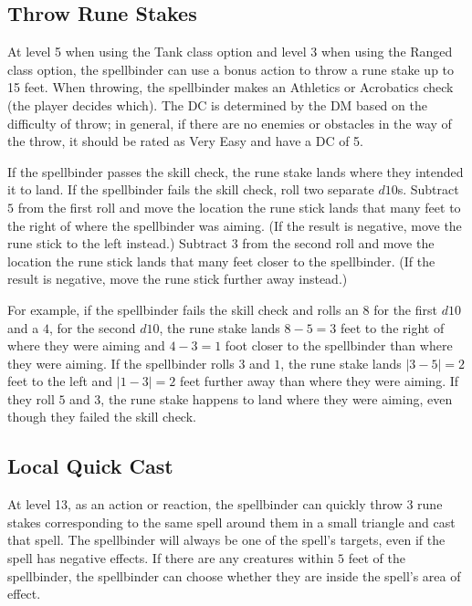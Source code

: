 \subsection{Throw Rune Stakes}
\label{ability:throw-rune-stakes}
At level 5 when using the Tank class option and level 3 when using the Ranged class option, the spellbinder can use a bonus action to throw a rune stake up to 15 feet. When throwing, the spellbinder makes an Athletics or Acrobatics check (the player decides which). The DC is determined by the DM based on the difficulty of throw; in general, if there are no enemies or obstacles in the way of the throw, it should be rated as Very Easy and have a DC of 5.

If the spellbinder passes the skill check, the rune stake lands where they intended it to land. If the spellbinder fails the skill check, roll two separate $d10$s. Subtract $5$ from the first roll and move the location the rune stick lands that many feet to the right of where the spellbinder was aiming. (If the result is negative, move the rune stick to the left instead.) Subtract $3$ from the second roll and move the location the rune stick lands that many feet closer to the spellbinder. (If the result is negative, move the rune stick further away instead.)

For example, if the spellbinder fails the skill check and rolls an $8$ for the first $d10$ and a $4$, for the second $d10$, the rune stake lands $8-5=3$ feet to the right of where they were aiming and $4-3=1$ foot closer to the spellbinder than where they were aiming. If the spellbinder rolls $3$ and $1$, the rune stake lands $|3-5|=2$ feet to the left and $|1-3|=2$ feet further away than where they were aiming. If they roll $5$ and $3$, the rune stake happens to land where they were aiming, even though they failed the skill check.

\subsection{Local Quick Cast}
At level 13, as an action or reaction, the spellbinder can quickly throw $3$ rune stakes corresponding to the same spell around them in a small triangle and cast that spell. The spellbinder will always be one of the spell's targets, even if the spell has negative effects. If there are any creatures within $5$ feet of the spellbinder, the spellbinder can choose whether they are inside the spell's area of effect.

